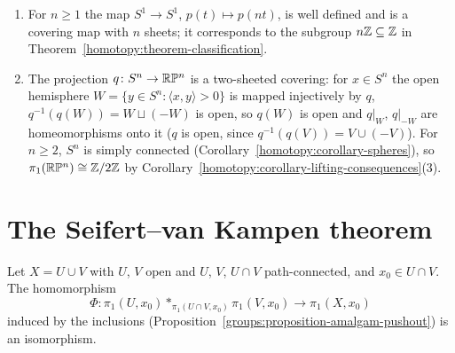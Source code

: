 \begin{example}\label{homotopy:example-coverings}
\begin{enumerate}
\item For $n \geq 1$ the map $S^1 \to S^1$, $p(t) \mapsto p(nt)$, is well defined and is a covering map with $n$ sheets; it corresponds to the subgroup
$n\mathbb{Z} \subseteq \mathbb{Z}$ in Theorem~\ref{homotopy:theorem-classification}.
\item The projection $q \colon S^n \to \mathbb{R}\mathbb{P}^n$ is a two-sheeted covering: for $x \in S^n$ the open hemisphere $W = \{y \in S^n : \langle x, y \rangle > 0\}$ is
mapped injectively by $q$, $q^{-1}(q(W)) = W \sqcup (-W)$ is open, so $q(W)$ is open and $q|_W$, $q|_{-W}$ are homeomorphisms onto it ($q$ is open, since
$q^{-1}(q(V)) = V \cup (-V)$). For $n \geq 2$, $S^n$ is simply connected (Corollary~\ref{homotopy:corollary-spheres}), so
$\pi_1(\mathbb{R}\mathbb{P}^n) \cong \mathbb{Z}/2\mathbb{Z}$ by Corollary~\ref{homotopy:corollary-lifting-consequences}(3).
\end{enumerate}
\end{example}

\section{The Seifert--van Kampen theorem}\label{homotopy:section-van-kampen}

\begin{theorem}\label{homotopy:theorem-van-kampen}
Let $X = U \cup V$ with $U$, $V$ open and $U$, $V$, $U \cap V$ path-connected, and $x_0 \in U \cap V$. The homomorphism
\[
\Phi \colon \pi_1(U, x_0) *_{\pi_1(U \cap V, x_0)} \pi_1(V, x_0) \to \pi_1(X, x_0)
\]
induced by the inclusions (Proposition~\ref{groups:proposition-amalgam-pushout}) is an isomorphism.
\end{theorem}


